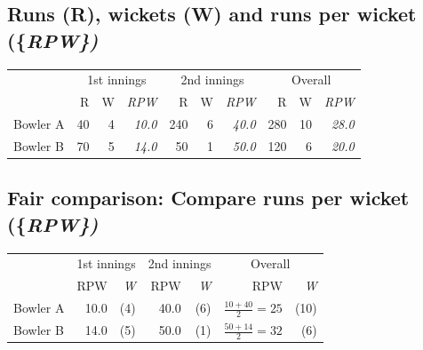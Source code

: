 \documentclass[
  10pt,
  b5paper]{book}
\begin{document}
\hypertarget{runs-r-wickets-w-and-runs-per-wicket}{%
\subsection*{\texorpdfstring{Runs (R), wickets (W) and runs per wicket (\{\em RPW\})}{Runs (R), wickets (W) and runs per wicket (\{\})}}\label{runs-r-wickets-w-and-runs-per-wicket}}

\vspace*{-8pt}

\begin{center}
\begin{tabular}{lrrr||rrr||rrr}
\hline
 & \multicolumn{3}{c}{1st innings} & \multicolumn{3}{c}{2nd innings} &
\multicolumn{3}{c}{Overall} \\
\cline{2-4} \cline{5-7} \cline{8-10}
& R & W & {\em RPW}   & R & W & {\em RPW} & R & W
& {\em RPW}\\
Bowler A & 40 & 4 & {\em 10.0} & 240 & 6 & {\em 40.0} & 280 & 10 &
{\em 28.0}\\
Bowler B & 70 & 5 & {\em 14.0} & 50 & 1 & {\em 50.0} & 120 & 6 & {\em 20.0} \\
\hline
\end{tabular}
\end{center}

\hypertarget{fair-comparison-compare-runs-per-wicket}{%
\subsection*{\texorpdfstring{Fair comparison: Compare runs per wicket (\{\em RPW\})}{Fair comparison: Compare runs per wicket (\{\})}}\label{fair-comparison-compare-runs-per-wicket}}

\vspace*{-5pt}

\begin{center}
\begin{tabular}{lrr||rr||rr}
\hline
 & \multicolumn{2}{c}{1st innings} & \multicolumn{2}{c}{2nd innings} &
\multicolumn{2}{c}{Overall} \\
\cline{2-3} \cline{4-5} \cline{6-7}
         &  RPW & {\em W}   &  RPW & {\em W} &
           RPW & {\em W} \\[4pt]
Bowler A &  10.0 & (4) & 40.0 & (6)  &
$\frac{10+40}{2} = 25$ & (10)\\[4pt]
Bowler B & 14.0 & (5)  & 50.0 & (1) & $\frac{50+14}{2} = 32$  &  (6)\\[4pt]
\cline{2-3} \cline{4-5} \cline{6-7}
\end{tabular}
\end{center}
\end{document}
